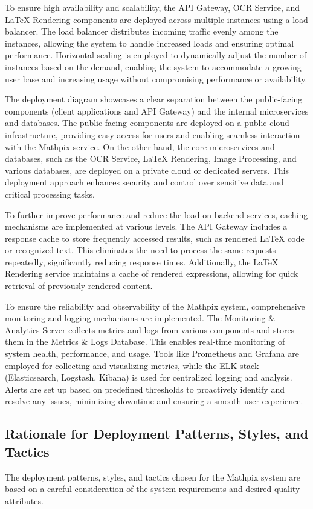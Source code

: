 \documentclass{article}
\begin{document}
To ensure high availability and scalability, the API Gateway, OCR Service, and LaTeX Rendering components are deployed across multiple instances using a load balancer. The load balancer distributes incoming traffic evenly among the instances, allowing the system to handle increased loads and ensuring optimal performance. Horizontal scaling is employed to dynamically adjust the number of instances based on the demand, enabling the system to accommodate a growing user base and increasing usage without compromising performance or availability.

The deployment diagram showcases a clear separation between the public-facing components (client applications and API Gateway) and the internal microservices and databases. The public-facing components are deployed on a public cloud infrastructure, providing easy access for users and enabling seamless interaction with the Mathpix service. On the other hand, the core microservices and databases, such as the OCR Service, LaTeX Rendering, Image Processing, and various databases, are deployed on a private cloud or dedicated servers. This deployment approach enhances security and control over sensitive data and critical processing tasks.

To further improve performance and reduce the load on backend services, caching mechanisms are implemented at various levels. The API Gateway includes a response cache to store frequently accessed results, such as rendered LaTeX code or recognized text. This eliminates the need to process the same requests repeatedly, significantly reducing response times. Additionally, the LaTeX Rendering service maintains a cache of rendered expressions, allowing for quick retrieval of previously rendered content.


To ensure the reliability and observability of the Mathpix system, comprehensive monitoring and logging mechanisms are implemented. The Monitoring \& Analytics Server collects metrics and logs from various components and stores them in the Metrics \& Logs Database. This enables real-time monitoring of system health, performance, and usage. Tools like Prometheus and Grafana are employed for collecting and visualizing metrics, while the ELK stack (Elasticsearch, Logstash, Kibana) is used for centralized logging and analysis. Alerts are set up based on predefined thresholds to proactively identify and resolve any issues, minimizing downtime and ensuring a smooth user experience.

\subsection{Rationale for Deployment Patterns, Styles, and Tactics}
The deployment patterns, styles, and tactics chosen for the Mathpix system are based on a careful consideration of the system requirements and desired quality attributes.
\end{document}
